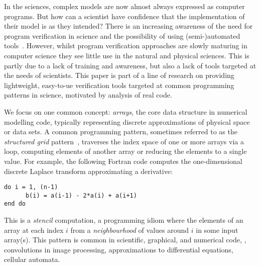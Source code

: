 \noindent
In the sciences, complex models are now almost always expressed as
computer programs. But how can a scientist have confidence that the
implementation of their model is as they intended? There is an
increasing awareness of the need for program verification in science
and the possibility of using (semi-)automated
tools~\cite{post2005computational,oberkampf2010verification,orchard2014computational}.
However, whilst program verification approaches are slowly maturing in
computer science they see little use in the natural and physical
sciences. This is partly due to a lack of training and awareness, but
also a lack of tools targeted at the needs of scientists. This
paper is part of a line of research on providing lightweight, easy-to-ue
verification tools targeted at common programming patterns in science, 
motivated by analysis of real code.

We focus on one common concept: \emph{arrays}, the core data structure
in numerical modelling code, typically representing discrete
approximations of physical space or data sets. A common programming
pattern, sometimes referred to as the \emph{structured grid}
pattern~\cite{Asanovic2006}, traverses the index space of one or more
arrays via a loop, computing elements of another array or reducing the
elements to a single value. For example, the following Fortran code
computes the one-dimensional discrete Laplace transform approximating
a derivative:
%
\begin{verbatim}
do i = 1, (n-1)
      b(i) = a(i-1) - 2*a(i) + a(i+1)
end do
\end{verbatim}
%
This is a \emph{stencil} computation, a programming idiom
where the elements of an array at each index $i$ from a
\emph{neighbourhood} of values around $i$ in some input array(s). This
pattern is common in scientific, graphical, and numerical
code, \eg{}, convolutions in image processing, approximations
to differential equations, cellular automata.

